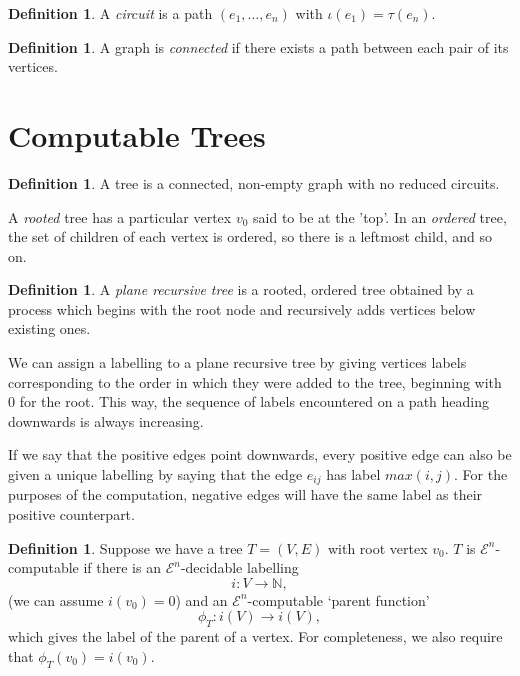 \documentclass[a4paper]{article}
\newcommand{\grz}[1]{$\mathcal{E}^{#1}$}	%
\newcommand{\NN}{\mathbb{N}}	%
\theoremstyle{plain}
\theoremstyle{definition}
\newtheorem{definition}[theorem]{Definition}
\begin{document}
\begin{definition}
A {\it circuit} is a path $(e_1, \dots, e_n)$ with $\iota(e_1) = \tau(e_n)$. 
\end{definition}

\begin{definition}
A graph is {\it connected} if there exists a path between each pair of its vertices.
\end{definition}

\section{Computable Trees \label{trees}}

\begin{definition}
A tree is a connected, non-empty graph with no reduced circuits.

A {\it rooted} tree has a particular vertex $v_0$ said to be at the 'top'. In an {\it ordered} tree, the set of children of each vertex is ordered, so there is a leftmost child, and so on. 
\end{definition}

\begin{definition}
A {\it plane recursive tree} is a rooted, ordered tree obtained by a process which begins with the root node and recursively adds vertices below existing ones.
\end{definition}

We can assign a labelling to a plane recursive tree by giving vertices labels corresponding to the order in which they were added to the tree, beginning with $0$ for the root. This way, the sequence of labels encountered on a path heading downwards is always increasing. 

If we say that the positive edges point downwards, every positive edge can also be given a unique labelling by saying that the edge $e_{ij}$ has label $max(i,j)$. For the purposes of the computation, negative edges will have the same label as their positive counterpart.

\begin{definition}
Suppose we have a tree $T=(V,E)$ with root vertex $v_0$. $T$ is \grz{n}-computable if there is an \grz{n}-decidable labelling 
\[i: V \rightarrow \NN,\]
(we can assume $i(v_0) = 0$) and an \grz{n}-computable `parent function'
\[\phi_T:i(V) \rightarrow i(V),\]
which gives the label of the parent of a vertex. For completeness, we also require that $\phi_T(v_0) = i(v_0)$.
\end{definition}
\end{document}
